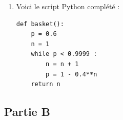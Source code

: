 \begin{enumerate}
\begin{enumerate}
			Or \quad $\dfrac{\ln \left( \np{0,0001} \right)}{\ln\left( \np{0,4} \right)} \approx \np{10,052}$.

			À partir de 11 lancers, la probabilité d'en réussir au moins un est supérieure à .

			\item Voici le script Python complété :
\begin{lstlisting}[style=python,xleftmargin=0.3\linewidth,xrightmargin=0.3\linewidth,numbers=none]
def basket():
	p = 0.6
	n = 1
	while p < 0.9999 :
		n = n + 1
		p = 1 - 0.4**n
	return n
\end{lstlisting}
		\end{enumerate}
	\end{enumerate}

	\subsection*{Partie B}

